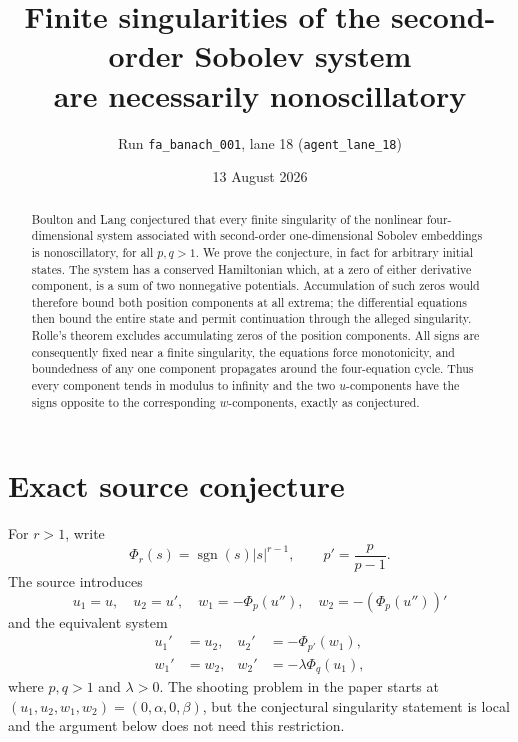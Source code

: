 \documentclass[11pt]{article}
\title{Finite singularities of the second-order Sobolev system\\
are necessarily nonoscillatory}
\author{Run \texttt{fa\_banach\_001}, lane 18
  (\texttt{agent\_lane\_18})}
\date{13 August 2026}
\newcommand{\sgn}{\operatorname{sgn}}
\begin{document}
\maketitle

\begin{abstract}
Boulton and Lang conjectured that every finite singularity of the nonlinear
four-dimensional system associated with second-order one-dimensional Sobolev
embeddings is nonoscillatory, for all $p,q>1$.  We prove the conjecture, in
fact for arbitrary initial states.  The system has a conserved Hamiltonian
which, at a zero of either derivative component, is a sum of two nonnegative
potentials.  Accumulation of such zeros would therefore bound both position
components at all extrema; the differential equations then bound the entire
state and permit continuation through the alleged singularity.  Rolle's
theorem excludes accumulating zeros of the position components.  All signs
are consequently fixed near a finite singularity, the equations force
monotonicity, and boundedness of any one component propagates around the
four-equation cycle.  Thus every component tends in modulus to infinity and
the two $u$-components have the signs opposite to the corresponding
$w$-components, exactly as conjectured.
\end{abstract}

\section{Exact source conjecture}

For $r>1$, write
\[
  \Phi_r(s)=\sgn(s)|s|^{r-1},\qquad p'=\frac{p}{p-1}.
\]
The source introduces
\[
 u_1=u,\quad u_2=u',\quad
 w_1=-\Phi_p(u''),\quad w_2=-(\Phi_p(u''))'
\]
and the equivalent system
\begin{equation}\label{system}
\begin{aligned}
 u_1'&=u_2, & u_2'&=-\Phi_{p'}(w_1),\\
 w_1'&=w_2, & w_2'&=-\lambda\Phi_q(u_1),
\end{aligned}
\end{equation}
where $p,q>1$ and $\lambda>0$.  The shooting problem in the paper starts at
$(u_1,u_2,w_1,w_2)=(0,\alpha,0,\beta)$, but the conjectural singularity
statement is local and the argument below does not need this restriction.
\end{document}
